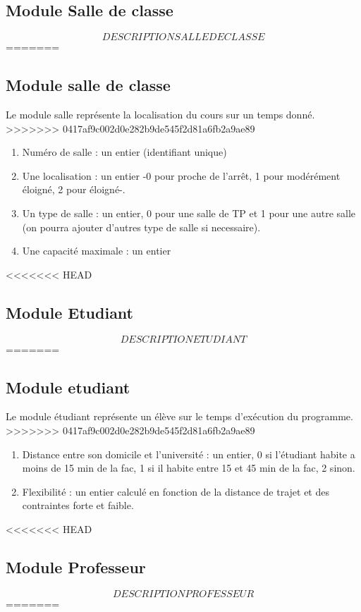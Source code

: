 \documentclass[a4paper,11pt]{article}
\begin{document}
\begin{enumerate}
	\subsection{Module Salle de classe}
		$$DESCRIPTION SALLE DE CLASSE$$
=======
	\subsection{Module salle de classe}
		Le module salle représente la localisation du cours sur un temps donné.
>>>>>>> 0417af9c002d0e282b9de545f2d81a6fb2a9ae89
		\begin{enumerate}
			\item Numéro de salle : un entier (identifiant unique)
			\item Une localisation : un entier -0 pour proche de l'arrêt, 1 pour modérément éloigné, 2 pour éloigné-. 
			\item Un type de salle : un entier, 0 pour une salle de TP et 1 pour une autre salle (on pourra ajouter d'autres type de salle si necessaire).
			\item Une capacité maximale : un entier
		\end{enumerate}
<<<<<<< HEAD
	\subsection{Module Etudiant}
		$$DESCRIPTION ETUDIANT$$
=======
	\subsection{Module etudiant}
		Le module étudiant représente un élève sur le temps d'exécution du programme.
>>>>>>> 0417af9c002d0e282b9de545f2d81a6fb2a9ae89
		\begin{enumerate}
			\item Distance entre son domicile et l'université : un entier, 0 si l'étudiant habite a moins de 15 min de la fac, 1 si il habite entre 15 et 45 min de la fac, 2 sinon.
			\item Flexibilité : un entier calculé en fonction de la distance de trajet et des contraintes forte et faible. 
			\end{enumerate}
<<<<<<< HEAD
	\subsection{Module Professeur}
		$$DESCRIPTION PROFESSEUR$$
=======

\end{enumerate}
\end{document}
